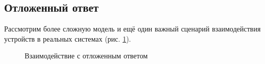 % 
% 
% 
% 
% 

\subsection{Отложенный ответ}

Рассмотрим более сложную модель и ещё один важный сценарий взаимодействия устройств в реальных системах (рис. \ref{fig:delayed-response}).

\begin{figure}[htp]
    \centering
    \caption[Взаимодействие с отложенным ответом]{Взаимодействие с отложенным ответом}
    \label{fig:delayed-response}
\end{figure}

